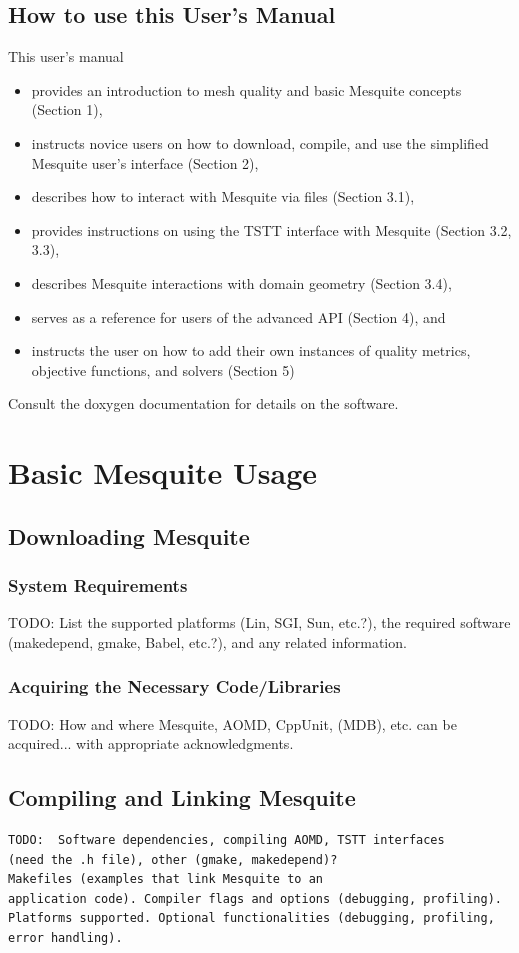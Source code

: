 \documentclass[letter]{report}
\begin{document}
\section{How to use this User's Manual}
This user's manual 
\begin{itemize}
\item provides an introduction to mesh quality and basic Mesquite concepts (Section 1), 
\item instructs novice users on how to download, compile, and use the 
simplified Mesquite user's interface (Section 2),
\item describes how to interact with Mesquite via files (Section 3.1), 
\item provides instructions on using the TSTT interface with Mesquite (Section 3.2, 3.3),
\item describes Mesquite interactions with domain geometry (Section 3.4),
\item serves as a reference for users of the advanced API (Section 4), and 
\item instructs the user on how to add their own instances of quality 
metrics, objective functions, and solvers (Section 5)
\end{itemize}
Consult the doxygen documentation for details on the software. \newline

\chapter{Basic Mesquite Usage}

\section{Downloading Mesquite}

\subsection{System Requirements}
TODO:  List the supported platforms (Lin, SGI, Sun, etc.?), the required
software (makedepend, gmake, Babel, etc.?), and any related information.
\subsection{Acquiring the Necessary Code/Libraries}
TODO:  How and where Mesquite, AOMD, CppUnit, (MDB), etc. can be
acquired... with appropriate acknowledgments.

\section{Compiling and Linking Mesquite}
\label{sec:compiling}
\begin{verbatim}
TODO:  Software dependencies, compiling AOMD, TSTT interfaces
(need the .h file), other (gmake, makedepend)?  
Makefiles (examples that link Mesquite to an 
application code). Compiler flags and options (debugging, profiling). 
Platforms supported. Optional functionalities (debugging, profiling, 
error handling).
\end{verbatim}
\end{document}
